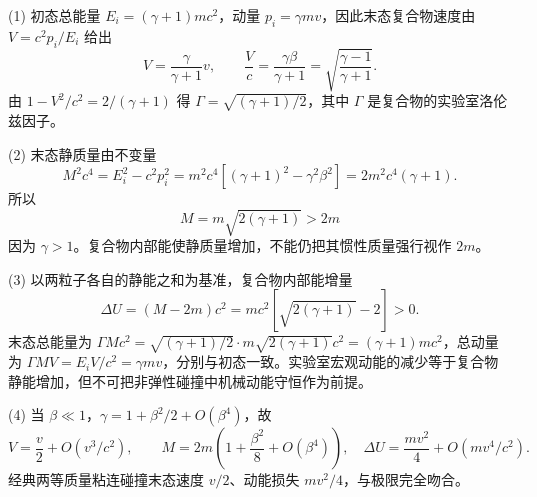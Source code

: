 (1) 初态总能量 \(E_i=(\gamma+1)mc^2\)，动量 \(p_i=\gamma m v\)，因此末态复合物速度由 \(V=c^2p_i/E_i\) 给出
\[
V=\frac{\gamma}{\gamma+1}v,\qquad
\frac Vc=\frac{\gamma\beta}{\gamma+1}
=\sqrt{\frac{\gamma-1}{\gamma+1}}.
\]
由 \(1-V^2/c^2=2/(\gamma+1)\) 得 \(\Gamma=\sqrt{(\gamma+1)/2}\)，其中 \(\Gamma\) 是复合物的实验室洛伦兹因子。

(2) 末态静质量由不变量
\[
M^2c^4=E_i^2-c^2p_i^2
=m^2c^4[(\gamma+1)^2-\gamma^2\beta^2]
=2m^2c^4(\gamma+1).
\]
所以
\[
M=m\sqrt{2(\gamma+1)}>2m
\]
因为 \(\gamma>1\)。复合物内部能使静质量增加，不能仍把其惯性质量强行视作 \(2m\)。

(3) 以两粒子各自的静能之和为基准，复合物内部能增量
\[
\Delta U=(M-2m)c^2=mc^2[\sqrt{2(\gamma+1)}-2]>0.
\]
末态总能量为 \(\Gamma Mc^2=\sqrt{(\gamma+1)/2}\cdot m\sqrt{2(\gamma+1)}c^2=(\gamma+1)mc^2\)，总动量为 \(\Gamma M V=E_iV/c^2=\gamma mv\)，分别与初态一致。实验室宏观动能的减少等于复合物静能增加，但不可把非弹性碰撞中机械动能守恒作为前提。

(4) 当 \(\beta\ll1\)，\(\gamma=1+\beta^2/2+O(\beta^4)\)，故
\[
V=\frac v2+O(v^3/c^2),\qquad
M=2m\left(1+\frac{\beta^2}{8}+O(\beta^4)\right),
\quad
\Delta U=\frac{mv^2}{4}+O(mv^4/c^2).
\]
经典两等质量粘连碰撞末态速度 \(v/2\)、动能损失 \(mv^2/4\)，与极限完全吻合。
